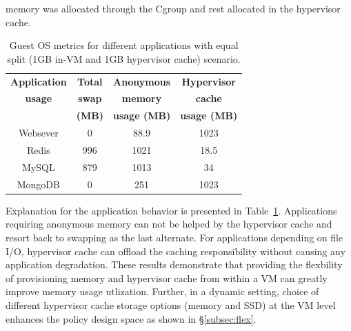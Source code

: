 memory was allocated through the Cgroup and rest allocated in the hypervisor cache.
%
\begin{table}[t]
\begin{center}
\begin{tabular}{|c|c|c|c|}
\hline
{\bf Application} & {\bf Total} & {\bf Anonymous} & {\bf Hypervisor} \\
{\bf usage } & {\bf swap} & {\bf memory} & {\bf cache} \\
 & {\bf (MB)} & {\bf usage (MB)} & {\bf usage (MB)} \\
\hline 
\hline 
Websever & 0 & 88.9 & 1023 \\
Redis & 996 &  1021 & 18.5 \\
MySQL & 879 & 1013 & 34 \\
MongoDB & 0 & 251 & 1023 \\
\hline 
\end{tabular}
\caption{Guest OS metrics for different applications with equal split (1GB in-VM and 1GB 
         hypervisor cache) scenario.}
\label{table:app_diagnosis}
\vspace{-1cm}
\end{center}
\end{table}

Explanation for the application behavior is presented in 
Table~\ref{table:app_diagnosis}.
%
Applications requiring anonymous memory can not be helped by the 
hypervisor cache and resort back to swapping as the last alternate.
%
For applications depending on file I/O, hypervisor cache 
can offload the caching responsibility without causing any
application degradation.
%
These results demonstrate that providing the flexbility of provisioning
memory and hypervisor cache from within a VM can greatly improve
memory usage utlization.
%
Further, in a dynamic setting, choice of different hypervisor 
cache storage options (memory and SSD) at the VM level enhances
the policy design space as shown in \S\ref{subsec:flex}. 
 
